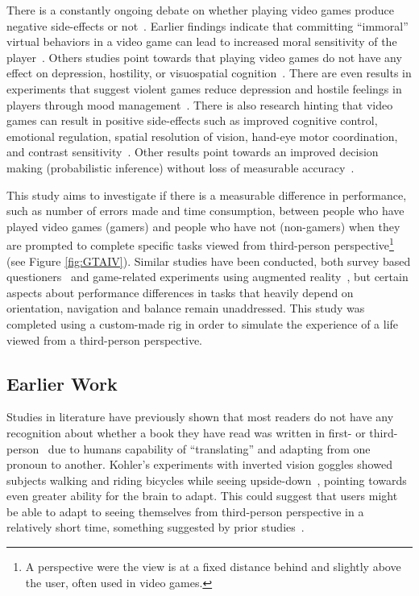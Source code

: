\documentclass[runningheads,a4paper,oribibl]{llncs}
\begin{document}
There is a constantly ongoing debate on whether playing video games produce negative side-effects or not~\cite{tear2014video}. Earlier findings indicate that committing ``immoral'' virtual behaviors in a video game can lead to increased moral sensitivity of the player~\cite{grizzard2014being}. Others studies point towards that playing video games do not have any effect on depression, hostility, or visuospatial cognition~\cite{valadez2012just}. There are even results in experiments that suggest violent games reduce depression and hostile feelings in players through mood management~\cite{ferguson2015hitman}. There is also research hinting that video games can result in positive side-effects such as improved cognitive control, emotional regulation, spatial resolution of vision, hand-eye motor coordination, and contrast sensitivity~\cite{gong2015enhanced}. Other results point towards an improved decision making (probabilistic inference) without loss of measurable accuracy~\cite{green2010improved}.

This study aims to investigate if there is a measurable difference in performance, such as number of errors made and time consumption, between people who have played video games (gamers) and people who have not (non-gamers) when they are prompted to complete specific tasks viewed from third-person perspective\footnote{A perspective were the view is at a fixed distance behind and slightly above the user, often used in video games.} (see Figure \ref{fig:GTAIV}). Similar studies have been conducted, both survey based questioners~\cite{schmierbach2011exploring} and game-related experiments using augmented reality~\cite{nakamura20103pi}, but certain aspects about performance differences in tasks that heavily depend on orientation, navigation and balance remain unaddressed. This study was completed using a custom-made rig in order to simulate the experience of a life viewed from a third-person perspective.

\subsection{Earlier Work}
Studies in literature have previously shown that most readers do not have any recognition about whether a book they have read was written in first- or third-person~\cite{hagg2012nya} due to humans capability of ``translating'' and adapting from one pronoun to another. Kohler's experiments with inverted vision goggles showed subjects walking and riding bicycles while seeing upside-down~\cite{kohler1962goggles}, pointing towards even greater ability for the brain to adapt. This could suggest that users might be able to adapt to seeing themselves from third-person perspective in a relatively short time, something suggested by prior studies~\cite{nakamura20103pi}.
\end{document}
